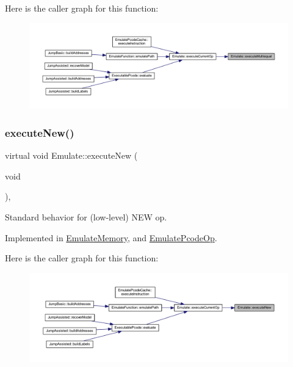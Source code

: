 Here is the caller graph for this function\+:
\nopagebreak
\begin{figure}[H]
\begin{center}
\leavevmode
\includegraphics[width=350pt]{class_emulate_ab98cf68b6d37869f65825f3fdf03019c_icgraph}
\end{center}
\end{figure}
\mbox{\label{class_emulate_ad6d1b182791e6d69b6469ea159729372}} 
\subsubsection{\texorpdfstring{executeNew()}{executeNew()}}
{\footnotesize\ttfamily virtual void Emulate\+::execute\+New (\begin{DoxyParamCaption}\item[{void}]{ }\end{DoxyParamCaption})\hspace{0.3cm}{\ttfamily [protected]}, {}}



Standard behavior for (low-\/level) N\+EW op. 



Implemented in \mbox{\hyperlink{class_emulate_memory_a1d547e9376fa63d32453b437a0537043}{Emulate\+Memory}}, and \mbox{\hyperlink{class_emulate_pcode_op_a7aecdf665942b8b429e02d3f56fce887}{Emulate\+Pcode\+Op}}.

Here is the caller graph for this function\+:
\nopagebreak
\begin{figure}[H]
\begin{center}
\leavevmode
\includegraphics[width=350pt]{class_emulate_ad6d1b182791e6d69b6469ea159729372_icgraph}
\end{center}
\end{figure}
\mbox{\label{class_emulate_ac4c13159c340cd33ca6f3b69d2b50e38}} 
